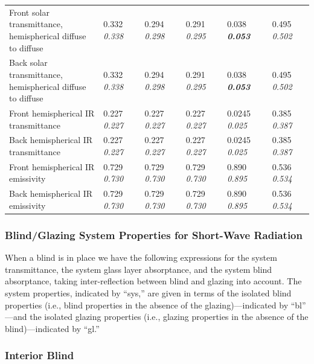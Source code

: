 \begin{longtable}[c]{p{1.0in}p{0.4in}p{0.4in}p{0.4in}p{0.4in}p{0.4in}p{0.4in}p{0.4in}p{0.4in}p{0.4in}p{0.4in}}
Front solar transmittance, hemispherical diffuse to diffuse & 0.332 \quad \quad \textit{0.338} &  & 0.294 \quad \quad \textit{0.298} &  & 0.291 \quad \quad \textit{0.295} &  & 0.038 \quad \quad \textbf{\textit{0.053}} &  & 0.495 \quad \quad \textit{0.502} \tabularnewline
Back solar transmittance, hemispherical diffuse to diffuse & 0.332 \quad \quad \textit{0.338} &  & 0.294 \quad \quad \textit{0.298} &  & 0.291 \quad \quad \textit{0.295} &  & 0.038 \quad \quad \textbf{\textit{0.053}} &  & 0.495 \quad \quad \textit{0.502} &  \tabularnewline
Front hemispherical IR transmittance & 0.227 \quad \quad \textit{0.227} &  & 0.227 \quad \quad \textit{0.227} &  & 0.227 \quad \quad \textit{0.227} &  & 0.0245 \quad \quad \textit{0.025} &  & 0.385 \quad \quad \textit{0.387} &  \tabularnewline
Back hemispherical IR transmittance & 0.227 \quad \quad \textit{0.227} &  & 0.227 \quad \quad \textit{0.227} &  & 0.227 \quad \quad \textit{0.227} &  & 0.0245 \quad \quad \textit{0.025} &  & 0.385 \quad \quad \textit{0.387} &  \tabularnewline
Front hemispherical IR emissivity & 0.729 \quad \quad \textit{0.730} &  & 0.729 \quad \quad \textit{0.730} &  & 0.729 \quad \quad \textit{0.730} &  & 0.890 \quad \quad \textit{0.895} &  & 0.536 \quad \quad \textit{0.534} &  \tabularnewline
Back hemispherical IR emissivity & 0.729 \quad \quad \textit{0.730} &  & 0.729 \quad \quad \textit{0.730} &  & 0.729 \quad \quad \textit{0.730} &  & 0.890 \quad \quad \textit{0.895} &  & 0.536 \quad \quad \textit{0.534} &  \tabularnewline
\bottomrule
\end{longtable}

\subsubsection{Blind/Glazing System Properties for Short-Wave Radiation}\label{blindglazing-system-properties-for-short-wave-radiation}

When a blind is in place we have the following expressions for the system transmittance, the system glass layer absorptance, and the system blind absorptance, taking inter-reflection between blind and glazing into account. The system properties, indicated by ``sys,'' are given in terms of the isolated blind properties (i.e., blind properties in the absence of the glazing)---indicated by ``bl'' ---and the isolated glazing properties (i.e., glazing properties in the absence of the blind)---indicated by ``gl.''

\subsubsection{Interior Blind}\label{interior-blind}

